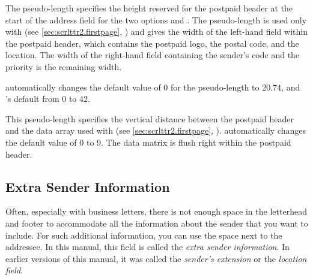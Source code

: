 \begin{Declaration}
\end{Declaration}
The  pseudo-length
specifies the height reserved for the postpaid header at the start of the
address field for the two options
%
 and
%
. The
 pseudo-length is used only with
 (see
\autoref{sec:scrlttr2.firstpage}, ) and
gives the width of the left-hand field within the postpaid header, which
contains the postpaid logo, the postal code, and the location. The width of
the right-hand field containing the sender's code and the priority is the
remaining width.

\KOMAScript{} automatically changes the default value of
0 for the  pseudo-length to 20.74, and
's default from 0 to 42.%
%
\EndIndexGroup


\begin{Declaration}
\end{Declaration}
This pseudo-length specifies the vertical
distance between the postpaid header and the data array used with
%
%
 (see \autoref{sec:scrlttr2.firstpage},
). \KOMAScript{}
automatically changes the default value of 0 to 9. The data
matrix is flush right within the postpaid header.%
\EndIndexGroup
%
\EndIndexGroup


\subsection{Extra Sender Information}
\BeginIndexGroup
{}

Often, especially with business letters, there is not enough space in the
letterhead and footer to accommodate all the information about the sender that
you want to include. For such additional information, you can use the space
next to the addressee. In this manual, this field is called the
\emph{extra sender information}. In earlier versions of this manual, it
was called the \emph{sender's extension} or the \emph{location field}.

